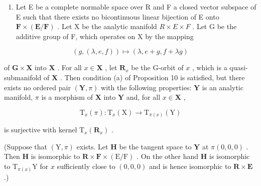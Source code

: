 \begin{enumerate}
\def\labelenumi{\arabic{enumi}.}
\setcounter{enumi}{6}
\tightlist
\item
  Let E be a complete normable space over R and F a closed vector subspace of E such that there exists no bicontinuous linear bijection of E onto \(\mathbf{F} \times (\mathbf{E}/\mathbf{F})\) . Let X be the analytic manifold \(R \times E \times F\) . Let G be the additive group of F, which operates on X by the mapping
\end{enumerate}

\[
(g, (\lambda , e, f)) \mapsto (\lambda , e + g, f + \lambda g)
\]

of \(\mathbf{G} \times \mathbf{X}\) into \(\mathbf{X}\) . For all \(x \in \mathbf{X}\) , let \(\mathbf{R}_x\) be the G-orbit of \(x\) , which is a quasi-submanifold of \(\mathbf{X}\) . Then condition (a) of Proposition 10 is satisfied, but there exists no ordered pair \((\mathbf{Y}, \pi)\) with the following properties: \(\mathbf{Y}\) is an analytic manifold, \(\pi\) is a morphism of \(\mathbf{X}\) into \(\mathbf{Y}\) and, for all \(x \in \mathbf{X}\) ,

\[
\mathrm{T} _ {x} (\pi): \mathrm{T} _ {x} (\mathrm{X}) \rightarrow \mathrm{T} _ {\pi (x)} (\mathrm{Y})
\]

is surjective with kernel \(\mathrm{T}_x(\mathbf{R}_x)\) .

(Suppose that \((\mathrm{Y},\pi)\) exists. Let \(\mathbf{H}\) be the tangent space to \(\mathbf{Y}\) at \(\pi (0,0,0)\) . Then \(\mathbf{H}\) is isomorphic to \(\mathbf{R}\times \mathbf{F}\times (\mathrm{E} / \mathrm{F})\) . On the other hand \(\mathbf{H}\) is isomorphic to \(\mathrm{T}_{\pi (x)}\mathrm{Y}\) for \(x\) sufficiently close to \((0,0,0)\) and is hence isomorphic to \(\mathbf{R}\times \mathbf{E}\) .)

